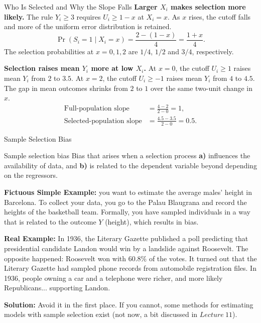 \documentclass[notes,10pt, aspectratio=169]{beamer}
\begin{document}
\begin{frame}{Who Is Selected and Why the Slope Falls}
\small
\textbf{Larger $X_i$ makes selection more likely.}
The rule $Y_i\geq3$ requires $U_i\geq1-x$ at $X_i=x$. As $x$ rises, the cutoff falls and more of the uniform error distribution is retained.
\[
\Pr(S_i=1\mid X_i=x)=\frac{2-(1-x)}{4}=\frac{1+x}{4}.
\]
The selection probabilities at $x=0,1,2$ are $1/4$, $1/2$ and $3/4$, respectively.

\medskip
\textbf{Selection raises mean $Y_i$ more at low $X_i$.}
At $x=0$, the cutoff $U_i\geq1$ raises mean $Y_i$ from $2$ to $3.5$.
At $x=2$, the cutoff $U_i\geq-1$ raises mean $Y_i$ from $4$ to $4.5$.
The gap in mean outcomes shrinks from $2$ to $1$ over the same two-unit change in $x$.
\[
\begin{aligned}
\text{Full-population slope} &= \frac{4-2}{2-0}=1,\\
\text{Selected-population slope} &= \frac{4.5-3.5}{2-0}=0.5.
\end{aligned}
\]
\end{frame}

\begin{frame}{Sample Selection Bias}

\begin{block}{Sample selection bias}
Bias that arises when a selection process \textbf{a)} influences the availability of data, and  \textbf{b)} is related to the dependent variable beyond depending on the regressors.
\end{block}
\vspace{1em}
\textbf{Fictuous Simple Example:} you want to estimate the average males' height in Barcelona. To collect your data, you go to the Palau Blaugrana and record the heights of the basketball team. Formally, you have sampled individuals in a way that is related to the outcome $Y$ (height), which results in bias.

\vspace{1em}

\textbf{Real Example:} In 1936, the Literary Gazette published a poll predicting that presidential candidate Landon would win by a landslide against Roosevelt. The opposite happened: Roosevelt won with 60.8\% of the votes. It turned out that the Literary Gazette had sampled phone records from automobile registration files. In 1936, people owning a car and a telephone were richer, and more likely Republicans... supporting Landon.

\vspace{1em}

\textbf{Solution:} Avoid it in the first place. If you cannot, some methods for estimating models with sample selection exist (not now,  a bit discussed in $Lecture~11$).
\end{frame}
\end{document}
